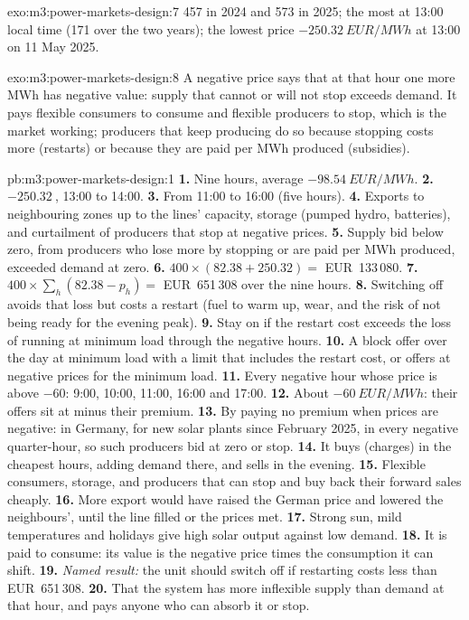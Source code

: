 \begin{solution}{exo:m3:power-markets-design:7}
457 in 2024 and 573 in 2025; the most at 13:00 local time (171 over the two years); the
lowest price $-\qty{250.32}{EUR/MWh}$ at 13:00 on 11 May 2025.
\end{solution}

\begin{solution}{exo:m3:power-markets-design:8}
A negative price says that at that hour one more MWh has negative value: supply that cannot
or will not stop exceeds demand. It pays flexible consumers to consume and flexible producers
to stop, which is the market working; producers that keep producing do so because stopping
costs more (restarts) or because they are paid per MWh produced (subsidies).
\end{solution}

\begin{solution}{pb:m3:power-markets-design:1}
\textbf{1.} Nine hours, average $-\qty{98.54}{EUR/MWh}$. \textbf{2.} $-\qty{250.32}{}$, 13:00
to 14:00. \textbf{3.} From 11:00 to 16:00 (five hours). \textbf{4.} Exports to neighbouring
zones up to the lines' capacity, storage (pumped hydro, batteries), and curtailment of
producers that stop at negative prices. \textbf{5.} Supply bid below zero, from producers who
lose more by stopping or are paid per MWh produced, exceeded demand at zero.
\textbf{6.} $400 \times (82.38 + 250.32) = $ EUR~133\,080. \textbf{7.} $400 \times \sum_h
(82.38 - p_h) = $ EUR~651\,308 over the nine hours. \textbf{8.} Switching off avoids that
loss but costs a restart (fuel to warm up, wear, and the risk of not being ready for the
evening peak). \textbf{9.} Stay on if the restart cost exceeds the loss of running at minimum
load through the negative hours. \textbf{10.} A block offer over the day at minimum load with
a limit that includes the restart cost, or offers at negative prices for the minimum load.
\textbf{11.} Every negative hour whose price is above $-60$: 9:00, 10:00, 11:00, 16:00 and
17:00. \textbf{12.} About $-\qty{60}{EUR/MWh}$: their offers sit at minus their premium.
\textbf{13.} By paying no premium when prices are negative: in Germany, for new solar
plants since February 2025, in every negative quarter-hour, so such producers bid at zero or
stop. \textbf{14.} It buys (charges) in the cheapest hours, adding demand there, and sells
in the evening. \textbf{15.} Flexible consumers, storage, and producers that can stop and buy
back their forward sales cheaply. \textbf{16.} More export would have raised the German price
and lowered the neighbours', until the line filled or the prices met. \textbf{17.} Strong sun,
mild temperatures and holidays give high solar output against low demand. \textbf{18.} It is
paid to consume: its value is the negative price times the consumption it can shift.
\textbf{19.} \emph{Named result:} the unit should switch off if restarting costs less than
EUR~651\,308. \textbf{20.} That the system has more inflexible supply than demand at that
hour, and pays anyone who can absorb it or stop.
\end{solution}

